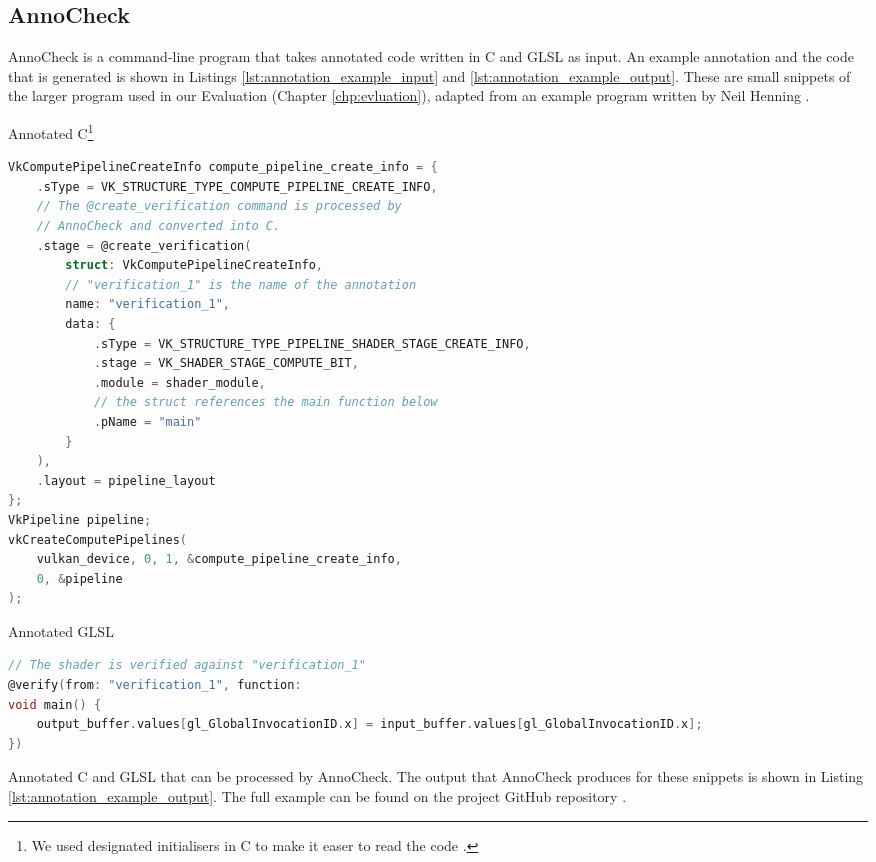 \documentclass[a4paper,12pt,twoside,openright]{report}
\begin{document}
\subsection{AnnoCheck}

AnnoCheck is a command-line program that takes annotated code written in C and
GLSL as input. An example annotation and the code that is generated is shown in
Listings \ref{lst:annotation_example_input} and
\ref{lst:annotation_example_output}. These are small snippets of the larger
program used in our Evaluation (Chapter \ref{chp:evluation}), adapted from an
example program written by Neil Henning \cite{VulkanComputeExampleSource}
\cite{VulkanComputeExampleBlog}.

\begin{lstfloat}
\begin{center}
Annotated C\footnote{We used designated initialisers in C to make it easer to
read the code \cite{DesignatedInitC}.}
\end{center}
\begin{lstlisting}[language=C]
VkComputePipelineCreateInfo compute_pipeline_create_info = {
    .sType = VK_STRUCTURE_TYPE_COMPUTE_PIPELINE_CREATE_INFO,
    // The @create_verification command is processed by
    // AnnoCheck and converted into C.
    .stage = @create_verification(
        struct: VkComputePipelineCreateInfo,
        // "verification_1" is the name of the annotation
        name: "verification_1",
        data: {
            .sType = VK_STRUCTURE_TYPE_PIPELINE_SHADER_STAGE_CREATE_INFO,
            .stage = VK_SHADER_STAGE_COMPUTE_BIT,
            .module = shader_module,
            // the struct references the main function below
            .pName = "main"
        }
    ),
    .layout = pipeline_layout
};
VkPipeline pipeline;
vkCreateComputePipelines(
    vulkan_device, 0, 1, &compute_pipeline_create_info,
    0, &pipeline
);
\end{lstlisting}
\begin{center} Annotated GLSL \end{center}
\begin{lstlisting}[language=C]
// The shader is verified against "verification_1"
@verify(from: "verification_1", function:
void main() {
    output_buffer.values[gl_GlobalInvocationID.x] = input_buffer.values[gl_GlobalInvocationID.x];
})
\end{lstlisting}
\caption{Annotated C and GLSL that can be processed by AnnoCheck. The output
that AnnoCheck produces for these snippets is shown in
Listing \ref{lst:annotation_example_output}. The full example can be found on
the project GitHub repository \cite{ProjectSource}.}
\label{lst:annotation_example_input}
\end{lstfloat}
\end{document}
